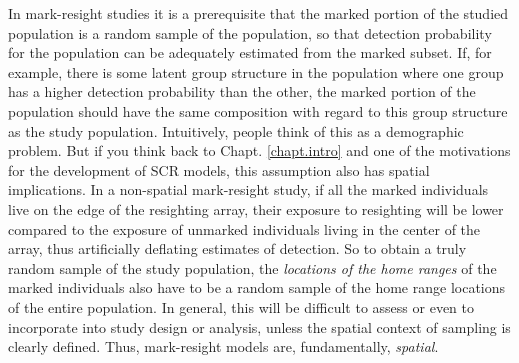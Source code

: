 In mark-resight studies it is a prerequisite that the marked portion
of the studied population is a random sample of the population, so
that detection probability for the population can be adequately
estimated from the marked subset. If, for example, there is some
latent group structure in the population where one group has a higher
detection probability than the other, the marked portion of the
population should have the same composition with regard to this group
structure as the study population. Intuitively, people think of this
as a demographic problem. But if you think back to
Chapt. \ref{chapt.intro} and one of the motivations for the
development of SCR models, this assumption also has spatial
implications. In a non-spatial mark-resight study, if all the
marked individuals live on the edge of the resighting array, their
exposure to resighting will be lower compared to the exposure of
unmarked individuals living in the center of the array,
thus artificially deflating estimates of detection. So to obtain a
truly random sample of the study population, the \emph{locations of
  the home ranges} of the marked individuals also have to be a random
sample of the home range locations of the entire population.
In general, this will be difficult to assess or even to incorporate into
study design or analysis, unless the spatial context of sampling is
clearly defined.
Thus, mark-resight models are, fundamentally, {\it spatial}.




